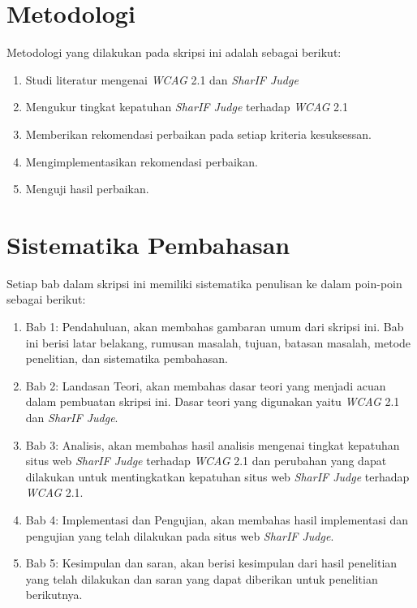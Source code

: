 \section{Metodologi}
\label{sec:metlit}
Metodologi yang dilakukan pada skripsi ini adalah sebagai berikut:

\begin{enumerate}
	\item Studi literatur mengenai \textit{WCAG} 2.1 dan \textit{SharIF Judge}
	\item Mengukur tingkat kepatuhan \textit{SharIF Judge} terhadap \textit{WCAG} 2.1
	\item Memberikan rekomendasi perbaikan pada setiap kriteria kesuksessan.
	\item Mengimplementasikan rekomendasi perbaikan.
	\item Menguji hasil perbaikan.
\end{enumerate}

\section{Sistematika Pembahasan}
\label{sec:sispem}
Setiap bab dalam skripsi ini memiliki sistematika penulisan ke dalam poin-poin sebagai berikut:

\begin{enumerate}
	\item Bab 1: Pendahuluan, akan membahas gambaran umum dari skripsi ini. Bab ini berisi latar
	belakang, rumusan masalah, tujuan, batasan masalah, metode penelitian, dan sistematika
	pembahasan.
	\item Bab 2: Landasan Teori, akan membahas dasar teori yang menjadi acuan dalam pembuatan
	skripsi ini. Dasar teori yang digunakan yaitu \textit{WCAG} 2.1 dan \textit{SharIF Judge}.
	\item Bab 3: Analisis, akan membahas hasil analisis mengenai tingkat kepatuhan situs web \textit{SharIF Judge} terhadap \textit{WCAG} 2.1 dan perubahan yang dapat dilakukan untuk mentingkatkan kepatuhan situs web \textit{SharIF Judge} terhadap \textit{WCAG} 2.1.
	\item Bab 4: Implementasi dan Pengujian, akan membahas hasil implementasi dan pengujian yang
	telah dilakukan pada situs web \textit{SharIF Judge}.
	\item Bab 5: Kesimpulan dan saran, akan berisi kesimpulan dari hasil penelitian yang telah dilakukan dan saran yang dapat diberikan untuk penelitian berikutnya.
\end{enumerate}